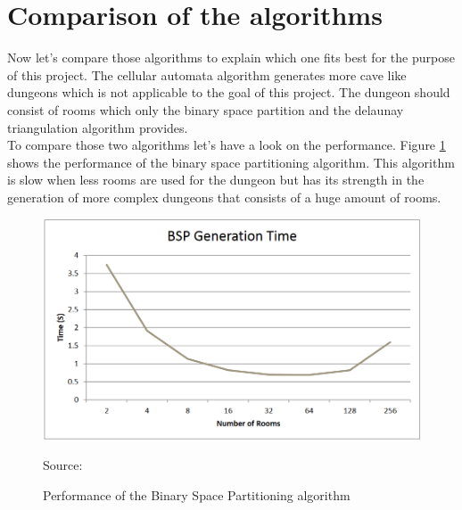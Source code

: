 \documentclass[a4paper,11pt,oneside]{scrreprt}
\begin{document}
\section{Comparison of the algorithms}
Now let's compare those algorithms to explain which one fits best for the purpose of this project. The cellular automata algorithm generates more cave like dungeons which is not applicable to the goal of this project. The dungeon should consist of rooms which only the binary space partition and the delaunay triangulation algorithm provides. 
\\
To compare those two algorithms let's have a look on the performance. Figure \ref{fig:bsp_performance} shows the performance of the binary space partitioning algorithm. This algorithm is slow when less rooms are used for the dungeon but has its strength in the generation of more complex dungeons that consists of a huge amount of rooms.  
\begin{figure}[htb]
	\centering
	\includegraphics[scale=0.5]{images/bsp_performance.png} 
	\caption{Performance of the Binary Space Partitioning algorithm}
	Source: \cite[][]{williams_investigation_nodate}
	\label{fig:bsp_performance}
\end{figure}
\end{document}
